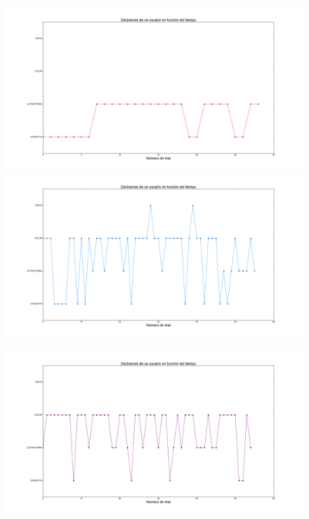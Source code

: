 \documentclass{beamer}
\begin{document}
\begin{frame}
\begin{figure}[h]
\begin{minipage}[c]{1\textwidth}
  \end{minipage}
\end{figure}
\end{frame}

\begin{frame}
\begin{figure}[h]
 \centering
  \begin{minipage}[c]{1\textwidth}
	\includegraphics[scale=0.11]{user1.png}
	\includegraphics[scale=0.11]{user14.png}
  \end{minipage}
  \begin{minipage}[c]{1\textwidth}
	\includegraphics[scale=0.11]{user6.png}

\end{minipage}
\end{figure}
\end{frame}
\end{document}
